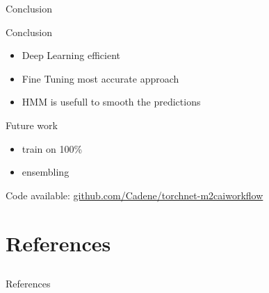 \begin{frame}{Conclusion}

	\begin{block}{Conclusion}
		\begin{itemize}
			\item Deep Learning efficient %
			\item Fine Tuning most accurate approach %
			\item HMM is usefull to smooth the predictions %
		\end{itemize}
	\end{block}
	
	\begin{block}{Future work}
		\begin{itemize}
			\item train on 100\%
			\item ensembling
		\end{itemize}
	\end{block}
	
	Code available: \url{github.com/Cadene/torchnet-m2caiworkflow}
	
\end{frame}

\section{References} \subsection{}\label{references}

\begin{frame}[allowframebreaks]{References}
	
	\printbibliography[heading=none]
	
\end{frame}